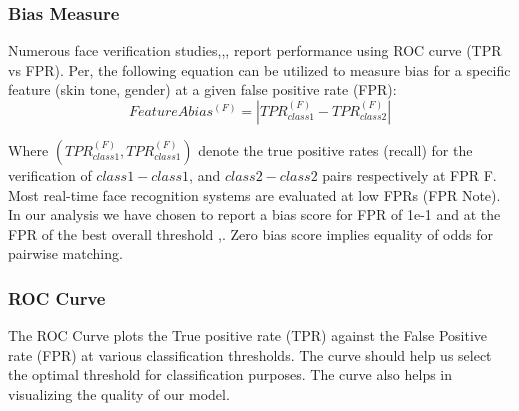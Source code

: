 \documentclass[conference]{IEEEtran}
\begin{document}
\subsubsection{Bias Measure}
Numerous face verification studies\cite{deng2019arcface},\cite{ranjan2019fast},\cite{liu2017sphereface},\cite{dhar2019measuring} report performance using ROC curve (TPR vs FPR). Per\cite{dhar2022distill},\cite{dhar2021pass} the following equation can be utilized to measure bias for a specific feature (skin tone, gender) at a given false positive rate (FPR):
\begin{equation}
    {Feature A  bias^{(F)}=\left|TPR_{class1}^{(F)} - TPR_{class2}^{(F)}\right|} 
\end{equation}

Where $(TPR_{class1}^{(F)}, TPR_{class1}^{(F)})$ denote the true positive rates (recall) for the verification of $class1-class1$, and $class2-class2$ pairs respectively at FPR F. Most real-time face recognition systems are evaluated at low FPRs (FPR Note). In our analysis we have chosen to report a bias score for FPR of 1e-1 and at the FPR of the best overall threshold \cite{dhar2022distill},\cite{dhar2021pass}. Zero bias score implies equality of odds for pairwise matching.

\subsubsection{ROC Curve}
The ROC Curve plots the True positive rate (TPR) against the False Positive rate (FPR) at various classification thresholds. The curve should help us select the optimal threshold for classification purposes. The curve also helps in visualizing the  quality of our model. 
\end{document}
